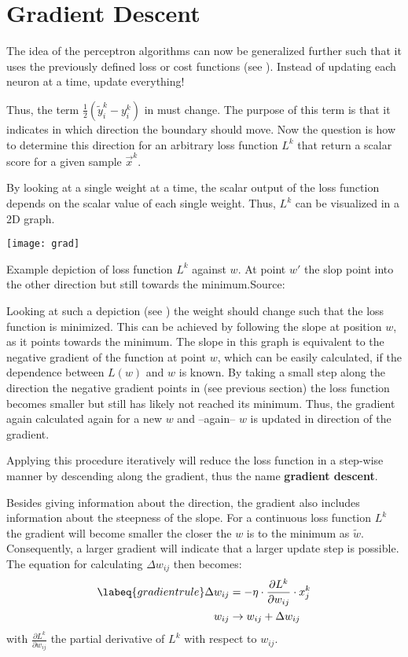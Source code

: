 \section{Gradient Descent}
The idea of the perceptron algorithms can now be generalized further such that it uses the previously defined loss or cost functions (see ).
Instead of updating each neuron at a time, update everything!

Thus, the term $\frac{1}{2}(\tilde{y}^k_i - y^k_i)$ in  must change.
The purpose of this term is that it indicates in which direction the boundary should move.
Now the question is how to determine this direction for an arbitrary loss function $L^k$ that return a scalar score for a given sample $\vec{x}^k$.

By looking at a single weight at a time, the scalar output of the loss function depends on the scalar value of each single weight.
Thus, $L^k$ can be visualized in a 2D graph.
\begin{marginfigure}
    \texttt{[image: grad]}
    \caption[]{Example depiction of loss function $L^k$ against $w$. At point $w'$ the slop point into the other direction but still towards the minimum.Source:~\cite{grad}}
\end{marginfigure}
Looking at such a depiction (see ) the weight should change such that the loss function is minimized.
This can be achieved by following the slope at position $w$, as it points towards the minimum.
The slope in this graph is equivalent to the negative gradient of the function at point $w$, which can be easily calculated, if the dependence between $L(w)$ and $w$ is known.
By taking a small step along the direction the negative gradient points in (see previous section) the loss function becomes smaller but still has likely not reached its minimum.
Thus, the gradient again calculated again for a new $w$ and --again-- $w$ is updated in direction of the gradient.

Applying this procedure iteratively will reduce the loss function in a step-wise manner by descending along the gradient, thus the name \textbf{gradient descent}.

Besides giving information about the direction, the gradient also includes information about the steepness of the slope.
For a continuous loss function $L^k$ the gradient will become smaller the closer the $w$ is to the minimum as $\tilde{w}$.
Consequently, a larger gradient will indicate that a larger update step is possible.\\
The equation for calculating $\Delta w_{ij}$ then becomes:
\begin{align}
    \labeq{gradientrule}
    \Delta w_{ij} & = - \eta \cdot \frac{\partial L^k}{\partial w_{ij}} \cdot x^k_j \\
    w_{ij} & \rightarrow w_{ij} + \Delta w_{ij}
\end{align}
with $\frac{\partial L^k}{\partial w_{ij}}$ the partial derivative of $L^k$ with respect to $w_{ij}$.

